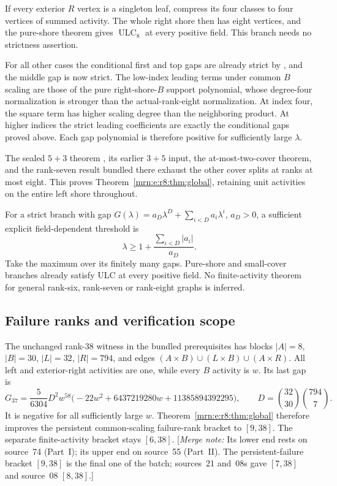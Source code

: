 \documentclass[11pt,a4paper]{article}
\theoremstyle{remark}\newtheorem{remark}[theorem]{Remark}
\newcommand{\ULC}{\operatorname{ULC}}      %
\newcommand{\mnote}[1]{[\textit{Merge note:} #1]}
\begin{document}
If every exterior $R$ vertex is a singleton leaf, compress its four classes to four vertices of summed activity. The whole right shore then has eight vertices, and the pure-shore theorem gives $\ULC_8$ at every positive field. This branch needs no strictness assertion.

For all other cases the conditional first and top gaps are already strict by \cite{b:m02}, and the middle gap is now strict. The low-index leading terms under common $B$ scaling are those of the pure right-shore-$B$ support polynomial, whose degree-four normalization is stronger than the actual-rank-eight normalization. At index four, the square term has higher scaling degree than the neighboring product. At higher indices the strict leading coefficients are exactly the conditional gaps proved above. Each gap polynomial is therefore positive for sufficiently large $\lambda$.

The sealed $5+3$ theorem \cite{b:m03}, its earlier $3+5$ input, the at-most-two-cover theorem, and the rank-seven result bundled there exhaust the other cover splits at ranks at most eight. This proves Theorem~\ref{mrn:e:r8:thm:global}, retaining unit activities on the entire left shore throughout.

For a strict branch with gap $G(\lambda)=a_D\lambda^D+\sum_{i<D}a_i\lambda^i$, $a_D>0$, a sufficient explicit field-dependent threshold is
\[
 \lambda\ge1+\frac{\sum_{i<D}|a_i|}{a_D}.
\]
Take the maximum over its finitely many gaps. Pure-shore and small-cover branches already satisfy ULC at every positive field. No finite-activity theorem for general rank-six, rank-seven or rank-eight graphs is inferred.

\subsection{Failure ranks and verification scope}
The unchanged rank-38 witness in the bundled prerequisites has blocks $|A|=8$, $|B|=30$, $|L|=32$, $|R|=794$, and edges $(A\times B)\cup(L\times B)\cup(A\times R)$. All left and exterior-right activities are one, while every $B$ activity is $w$. Its last gap is
\[
 G_{37}=\frac5{6304}D^2w^{58}
 \bigl(-22w^2+6437219280w+11385894392295\bigr),
 \qquad D=\binom{32}{30}\binom{794}{7}.
\]
It is negative for all sufficiently large $w$. Theorem~\ref{mrn:e:r8:thm:global} therefore improves the persistent common-scaling failure-rank bracket to $[9,38]$. The separate finite-activity bracket stays $[6,38]$. \mnote{Its lower end rests on source~74 (Part~I); its upper end on source~55 (Part~II). The persistent-failure bracket $[9,38]$ is the final one of the batch; sources~21 and~08s gave $[7,38]$ and source~08 $[8,38]$.}
\end{document}
